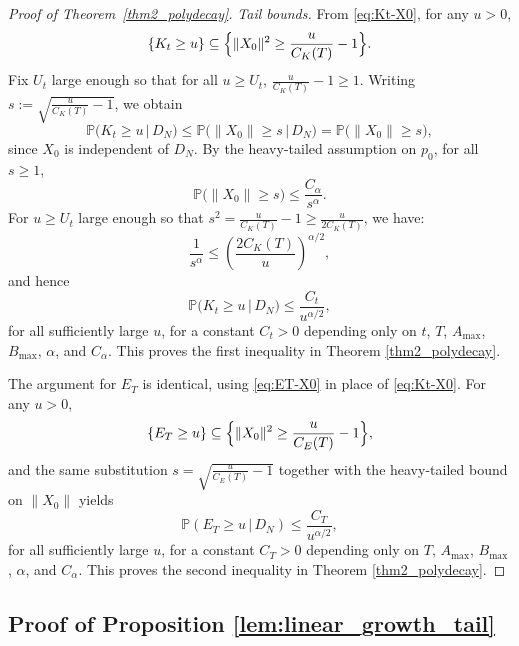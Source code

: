 \documentclass[a4paper,11pt]{article}
\theoremstyle{plain}
\theoremstyle{definition}
\begin{document}
\begin{proof}[Proof of Theorem~\ref{thm2_polydecay}]
\medskip\noindent
\emph{Tail bounds.}
From \eqref{eq:Kt-X0}, for any \(u > 0\),
\[
\{K_t \ge u\}
\subseteq \Bigl\{\|X_0\|^2 \ge \frac{u}{C_K(T)} - 1\Bigr\}.
\]
Fix \(U_t\) large enough so that for all \(u \ge U_t\),
\(\frac{u}{C_K(T)} - 1 \ge 1\). Writing \(s := \sqrt{\frac{u}{C_K(T)} - 1}\),
we obtain
\[
\mathbb{P}\bigl(K_t \ge u \,\big|\, D_N\bigr)
\le \mathbb{P}\bigl(\|X_0\| \ge s \,\big|\, D_N\bigr)
= \mathbb{P}\bigl(\|X_0\| \ge s\bigr),
\]
since \(X_0\) is independent of \(D_N\). By the heavy-tailed assumption on \(p_0\),
for all \(s \ge 1\),
\[
\mathbb{P}\bigl(\|X_0\| \ge s\bigr)
\le \frac{C_\alpha}{s^\alpha}.
\]
For $u \ge U_t$ large enough so that $s^2 = \frac{u}{C_K(T)} - 1 \ge \frac{u}{2C_K(T)}$,
we have:
\[
\frac{1}{s^\alpha} \le \left(\frac{2C_K(T)}{u}\right)^{\alpha/2},
\]
and hence
\[
\mathbb{P}\bigl(K_t \ge u \,\big|\, D_N\bigr)
\le \frac{C_t}{u^{\alpha/2}},
\]
for all sufficiently large $u$, for a constant $C_t>0$ depending only on $t$, $T$, $A_{\max}$, $B_{\max}$, $\alpha$, and $C_\alpha$. This proves the first inequality in Theorem \ref{thm2_polydecay}.

The argument for $E_T$ is identical, using \eqref{eq:ET-X0} in place of
\eqref{eq:Kt-X0}. For any $u > 0$,
\[
\{E_T \ge u\}
\subseteq \Bigl\{\|X_0\|^2 \ge \frac{u}{C_E(T)} - 1\Bigr\},
\]
and the same substitution $s = \sqrt{\frac{u}{C_E(T)} - 1}$ together with the heavy-tailed bound on $\|X_0\|$ yields
\[
\mathbb{P}(E_T \ge u \,\big|\, D_N)
\le \frac{C_T}{u^{\alpha/2}},
\]
for all sufficiently large $u$, for a constant $C_T>0$ depending only on $T$, $A_{\max}$, $B_{\max}$, $\alpha$, and $C_\alpha$. This proves the second inequality in Theorem \ref{thm2_polydecay}.

\end{proof}

\subsection{Proof of Proposition \ref{lem:linear_growth_tail}}
\end{document}
